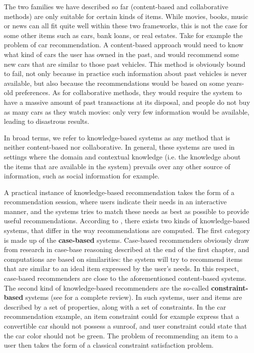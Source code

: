 The two families we have described so far (content-based and collaborative
methods) are only suitable for certain kinds of items. While movies, books,
music or news can all fit quite well within these two frameworks, this is not
the case for some other items such as cars, bank loans, or real estates. Take
for example the problem of car recommendation. A content-based approach would
need to know what kind of cars the user has owned in the past, and would
recommend some new cars that are similar to those past vehicles. This method is
obviously bound to fail, not only because in practice such information about
past vehicles is never available, but also because the recommendations would be
based on some years-old preferences. As for collaborative methods, they would
require the system to have a massive amount of past transactions at its
disposal, and
people do not buy as many cars as they watch movies: only very few information
would be available, leading to disastrous results.

In broad terms, we refer to knowledge-based systems as any method that is
neither content-based nor collaborative. In general, these systems are used in
settings where the domain and contextual knowledge (i.e. the knowledge about the
items that are available in the system) prevails over any other source of
information, such as social information for example.

A practical instance of  knowledge-based recommendation takes the form of a
recommendation session, where users indicate their needs in an interactive
manner, and the systems tries to match these needs as best as possible to
provide useful recommendations. According to \cite{FelBur08}, there exists two
kinds of knowledge-based systems, that differ in the way recommendations are
computed. The first category is made up of the \textbf{case-based} systems.
Case-based recommenders obviously draw from research in case-base reasoning
described at the end of the first chapter, and computations are based on
similarities: the system will try to recommend items that are similar to an
ideal item expressed by the user's needs. In
this respect, case-based recommenders are close to the aforementioned
content-based systems. The second  kind of knowledge-based recommenders are the
so-called \textbf{constraint-based} systems (see \cite{FelFriJanZan11} for a complete
review). In such systems, user and items are described
by a set of properties, along with a set of constraints. In the car
recommendation example, an item constraint could for example express that a
convertible car should not possess a sunroof, and user constraint could state
that the car color should not be green. The problem of recommending an item to
a user then takes the form of a classical constraint satisfaction
problem.

